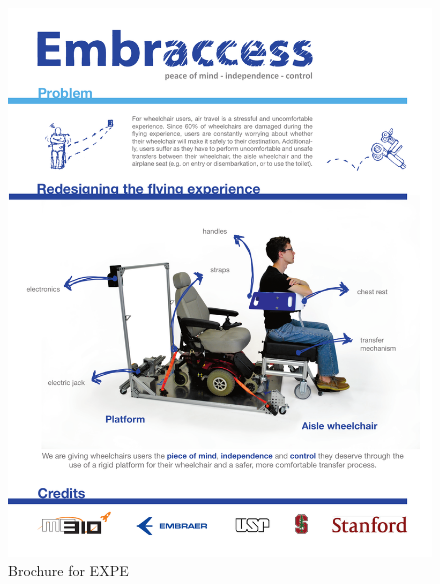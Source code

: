 \begin{figure}[h!]
	\centering
		\includegraphics[width=1\textwidth, page=1]{Figures/Brochure.pdf}
		\caption{Brochure for EXPE}
		\label{fig:brochure}
\end{figure}
